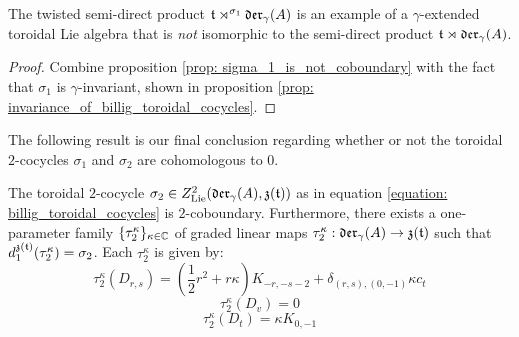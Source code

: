         \begin{corollary}
            The twisted semi-direct product $\mathfrak{t} \rtimes^{\sigma_1} \mathfrak{der}_{\gamma}(A)$ is an example of a $\gamma$-extended toroidal Lie algebra that is \textit{not} isomorphic to the semi-direct product $\mathfrak{t} \rtimes \mathfrak{der}_{\gamma}(A)$.
        \end{corollary}
            \begin{proof}
                Combine proposition \ref{prop: sigma_1_is_not_coboundary} with the fact that $\sigma_1$ is $\gamma$-invariant, shown in proposition \ref{prop: invariance_of_billig_toroidal_cocycles}.
            \end{proof}

        The following result is our final conclusion regarding whether or not the toroidal $2$-cocycles $\sigma_1$ and $\sigma_2$ are cohomologous to $0$.
        \begin{proposition} \label{prop: cohomological_non_triviality_of_billig_toroidal_cocycles}
            The toroidal $2$-cocycle $\sigma_2 \in Z^2_{\mathrm{Lie}}(\mathfrak{der}_{\gamma}(A), \mathfrak{z}(\mathfrak{t}) )$ as in equation \eqref{equation: billig_toroidal_cocycles} is $2$-coboundary. Furthermore, there exists a one-parameter family $\{\tau_2^{\kappa}\}_{\kappa \in \mathbb{C}}$ of graded linear maps $\tau_2^{\kappa}: \mathfrak{der}_{\gamma}(A) \to \mathfrak{z}(\mathfrak{t})$ such that $d_1^{\mathfrak{z}(\mathfrak{t})}(\tau_2^{\kappa}) = \sigma_2$. Each $\tau_2^{\kappa}$ is given by:
                $$\tau_2^{\kappa}(D_{r, s}) = \left( \frac12 r^2 + r\kappa \right) K_{-r, -s - 2} + \delta_{(r, s), (0, -1)} \kappa c_t$$
                $$\tau_2^{\kappa}(D_v) = 0$$
                $$\tau_2^{\kappa}(D_t) = \kappa K_{0, -1}$$
        \end{proposition}
